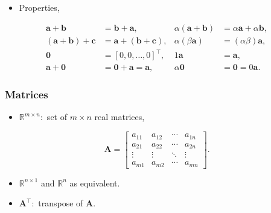 \documentclass[12pt,thmsa]{article}
\begin{document}
\begin{itemize}
	\item Properties,
\end{itemize}

\begin{equation*}
	\begin{aligned}
		\boldsymbol{a}+\boldsymbol{b} & =\boldsymbol{b}+\boldsymbol{a}, & \alpha(\boldsymbol{a}+\boldsymbol{b}) & =\alpha \boldsymbol{a}+\alpha \boldsymbol{b}, \\
		(\boldsymbol{a}+\boldsymbol{b})+\boldsymbol{c} & =\boldsymbol{a}+(\boldsymbol{b}+\boldsymbol{c}), & \alpha(\beta \boldsymbol{a}) & =(\alpha \beta) \boldsymbol{a}, \\
		\mathbf{0} & =[0,0, \ldots, 0]^{\top}, & 1 \boldsymbol{a} & =\boldsymbol{a}, \\
		\boldsymbol{a}+\mathbf{0} & =\mathbf{0}+\boldsymbol{a}=\boldsymbol{a}, & \alpha \mathbf{0} & =\mathbf{0}=0 \boldsymbol{a}.
	\end{aligned}
\end{equation*}

\subsubsection{Matrices}

\begin{itemize}
	\item \(\mathbb{R}^{m \times n}:\) set of \(m \times n\) real matrices,
\end{itemize}

\begin{equation*}
	\boldsymbol{A}=\left[\begin{array}{cccc}
		a_{11} & a_{12} & \cdots & a_{1 n} \\
		a_{21} & a_{22} & \cdots & a_{2 n} \\
		\vdots & \vdots & \ddots & \vdots \\
		a_{m 1} & a_{m 2} & \cdots & a_{m n}
	\end{array}\right].
\end{equation*}

\begin{itemize}
	\item \(\mathbb{R}^{n \times 1}\) and \(\mathbb{R}^{n}\) as equivalent.
	
	\item \(\boldsymbol{A}^{\top}:\) transpose of \(\boldsymbol{A}\).
	
\end{itemize}
\end{document}
